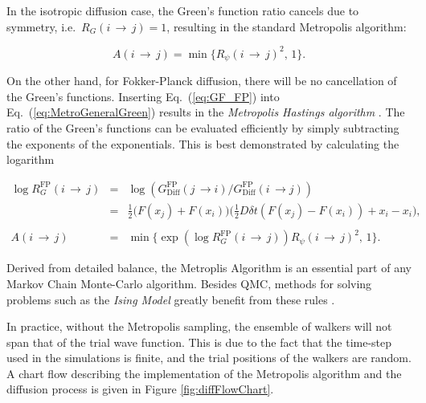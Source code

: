 In the isotropic diffusion case, the Green's function ratio cancels due to symmetry, i.e.~$R_G(i\,\rightarrow\,j) = 1$, resulting in the standard Metropolis algorithm:

\begin{equation}
\label{eq:Metropolis_standard}
 A(i\,\rightarrow\,j) = \min\{R_\psi(i\,\rightarrow\,j)^2, \,1\}.
\end{equation}

On the other hand, for Fokker-Planck diffusion, there will be no cancellation of the Green's functions. Inserting Eq.~(\ref{eq:GF_FP}) into Eq.~(\ref{eq:MetroGeneralGreen}) results in the \textit{Metropolis Hastings algorithm} \cite{robertcasella}. The ratio of the Green's functions can be evaluated efficiently by simply subtracting the exponents of the exponentials. This is best demonstrated by calculating the logarithm

\begin{eqnarray}
 \log{R_G^\mathrm{FP}(i\,\rightarrow\,j)} &=& \log \left(G_\mathrm{Diff}^\mathrm{FP}(j\,\rightarrow i)/G_\mathrm{Diff}^\mathrm{FP}(i\,\rightarrow j)\right) \nonumber \\
                                    &=& \frac{1}{2}\big(F(x_j) + F(x_i)\big)\big(\frac{1}{2}D\delta t(F(x_j) - F(x_i)) + x_i - x_i\big), \\
                                    \nonumber\\
 A(i\,\rightarrow\,j) &=& \min\{\exp \left(\log R_G^\mathrm{FP}(i\,\rightarrow\,j)\right)R_\psi(i\,\rightarrow\,j)^2, \,1\}. \label{eq:MetropolisHastings}
\end{eqnarray}

Derived from detailed balance, the Metroplis Algorithm is an essential part of any Markov Chain Monte-Carlo algorithm. Besides QMC, methods for solving problems such as the \textit{Ising Model} greatly benefit from these rules \cite{morten}.

In practice, without the Metropolis sampling, the ensemble of walkers will not span that of the trial wave function. This is due to the fact that the time-step used in the simulations is finite, and the trial positions of the walkers are random. A chart flow describing the implementation of the Metropolis algorithm and the diffusion process is given in Figure \ref{fig:diffFlowChart}.

